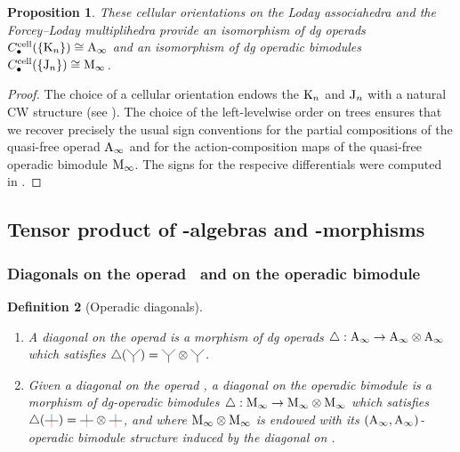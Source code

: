 \documentclass[10pt]{amsart}
\newtheorem{definition}{Definition}[section]
\newtheorem{proposition}[definition]{Proposition}
\theoremstyle{remark}
\begin{document}
\begin{proposition} 
\label{prop:cellular-chains}
These cellular orientations on the Loday associahedra and the Forcey--Loday multiplihedra provide an isomorphism of dg operads $C_\bullet^{\mathrm{cell}}(\{\mathrm{K}_n\})\cong \mathrm{A}_\infty$ and an isomorphism of dg operadic bimodules $C_\bullet^{\mathrm{cell}}(\{\mathrm{J}_n\})\cong \mathrm{M}_\infty$. 
\end{proposition}

\begin{proof}
The choice of a cellular orientation endows the $\mathrm{K}_n$ and $\mathrm{J}_n$ with a natural CW structure (see \cite[Proposition 4.22]{LA21}).
The choice of the left-levelwise order on trees ensures that we recover precisely the usual sign conventions for the partial compositions of the quasi-free operad $\mathrm{A}_\infty$ and for the action-composition maps of the quasi-free operadic bimodule $\mathrm{M}_\infty$. 
The signs for the respecive differentials were computed in \cite[Section 1.4]{mazuir-I}.
\end{proof}

\subsection{Tensor product of \Ainf -algebras and \Ainf -morphisms}

\subsubsection{Diagonals on the operad \Ainf\ and on the operadic bimodule \Minf}

\begin{definition}[Operadic diagonals] $ $
\begin{enumerate}[leftmargin=*]
    \item A \emph{diagonal on the operad \Ainf} is a morphism of dg operads $\triangle : \mathrm{A}_\infty \rightarrow \mathrm{A}_\infty \otimes \mathrm{A}_\infty$ which satisfies $\triangle (\arbreopdeux) = \arbreopdeux \otimes \arbreopdeux$. 
    \item Given a diagonal on the operad \Ainf, a \emph{diagonal on the operadic bimodule \Minf} is a morphism of dg-operadic bimodules $\triangle : \mathrm{M}_\infty \rightarrow \mathrm{M}_\infty \otimes \mathrm{M}_\infty$ which satisfies $\triangle ( \arbreopunmorph ) = \arbreopunmorph \otimes \arbreopunmorph$, and where $\mathrm{M}_\infty \otimes \mathrm{M}_\infty$ is endowed with its $(\mathrm{A}_\infty , \mathrm{A}_\infty)$-operadic bimodule structure induced by the diagonal on \Ainf .
\end{enumerate}
\end{definition}
\end{document}
